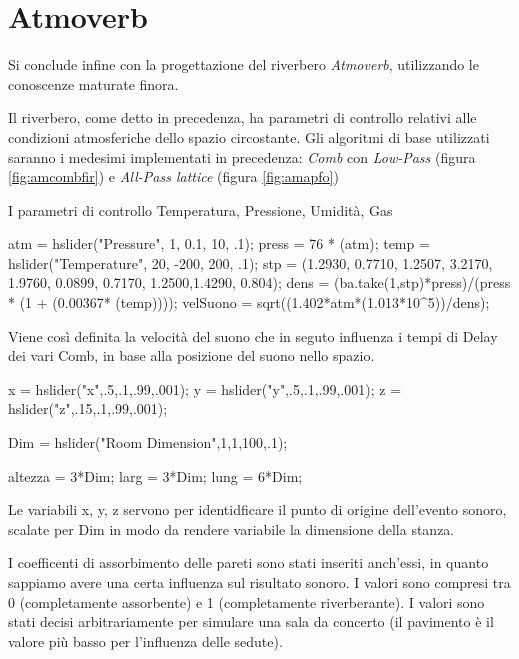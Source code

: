 \section{Atmoverb}

Si conclude infine con la progettazione del riverbero \emph{Atmoverb},
utilizzando le conoscenze maturate finora.

Il riverbero, come detto in precedenza, ha parametri di controllo relativi alle
condizioni atmosferiche dello spazio circostante. 
Gli algoritmi di base utilizzati saranno i medesimi implementati in precedenza:
\emph{Comb} con \emph{Low-Pass} (figura \ref{fig:amcombfir}) e
\emph{All-Pass lattice} (figura \ref{fig:amapfo})

I parametri di controllo Temperatura, Pressione, Umidità, Gas

\begin{code}
atm = hslider("Pressure", 1, 0.1, 10, .1);
press = 76 * (atm);
temp = hslider("Temperature", 20, -200, 200, .1);
stp = (1.2930, 0.7710, 1.2507, 3.2170, 1.9760, 0.0899, 0.7170, 1.2500,1.4290, 0.804);
dens = (ba.take(1,stp)*press)/(press * (1 + (0.00367* (temp))));
velSuono = sqrt((1.402*atm*(1.013*10^5))/dens);
\end{code}


Viene così definita la velocità del suono che in seguto influenza i tempi di
Delay dei vari Comb, in base alla posizione del suono nello spazio.

\begin{code}
x = hslider("x",.5,.1,.99,.001);
y = hslider("y",.5,.1,.99,.001);
z = hslider("z",.15,.1,.99,.001);

Dim = hslider("Room Dimension",1,1,100,.1);

altezza = 3*Dim;
larg = 3*Dim;
lung = 6*Dim;
\end{code}


Le variabili x, y, z servono per identidficare il punto di origine dell'evento sonoro, scalate
per Dim in modo da rendere variabile la dimensione della stanza.

I coefficenti di assorbimento delle pareti sono stati inseriti anch'essi, in quanto sappiamo
avere una certa influenza sul risultato sonoro. I valori sono compresi tra 0
(completamente assorbente) e 1 (completamente riverberante). I valori sono stati decisi
arbitrariamente per simulare una sala da concerto (il pavimento è il valore più basso per
l'influenza delle sedute).

